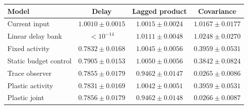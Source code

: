\begin{tabular}{lccc}\toprule
Model & Delay & Lagged product & Covariance \\\midrule
Current input & $1.0010\pm0.0015$ & $1.0015\pm0.0024$ & $1.0167\pm0.0177$ \\
Linear delay bank & $<10^{-14}$ & $1.0111\pm0.0048$ & $1.0248\pm0.0270$ \\
Fixed activity & $0.7832\pm0.0168$ & $1.0045\pm0.0056$ & $0.3959\pm0.0531$ \\
Static budget control & $0.7905\pm0.0153$ & $1.0050\pm0.0056$ & $0.3842\pm0.0824$ \\
Trace observer & $0.7855\pm0.0179$ & $0.9462\pm0.0147$ & $0.0265\pm0.0086$ \\
Plastic activity & $0.7831\pm0.0169$ & $1.0042\pm0.0051$ & $0.3959\pm0.0531$ \\
Plastic joint & $0.7856\pm0.0179$ & $0.9462\pm0.0148$ & $0.0266\pm0.0087$ \\
\bottomrule\end{tabular}
